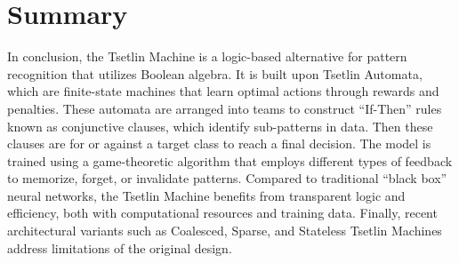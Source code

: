 \section{Summary}
In conclusion, the Tsetlin Machine is a logic-based alternative for pattern recognition that utilizes Boolean algebra. It is built upon Tsetlin Automata, which are finite-state machines that learn optimal actions through rewards and penalties. These automata are arranged into teams to construct ``If-Then'' rules known as conjunctive clauses, which identify sub-patterns in data. Then these clauses are for or against a target class to reach a final decision. The model is trained using a game-theoretic algorithm that employs different types of feedback to memorize, forget, or invalidate patterns. Compared to traditional ``black box'' neural networks, the Tsetlin Machine benefits from transparent logic and efficiency, both with computational resources and training data. Finally, recent architectural variants such as Coalesced, Sparse, and Stateless Tsetlin Machines address limitations of the original design.